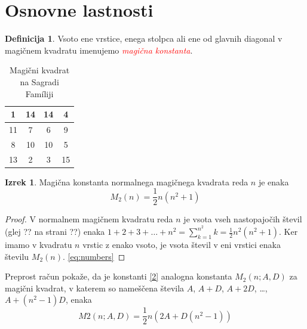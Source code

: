 \documentclass[a4paper,12pt]{article}
\theoremstyle{definition}
\newtheorem{theorem}{Izrek}
\newtheorem{definition}{Definicija}
\begin{document}

\section{Osnovne lastnosti}

  \begin{definition}
      Vsoto ene vrstice, enega stolpca ali ene od glavnih diagonal
      v magičnem kvadratu imenujemo \textcolor{red}{\emph{magična konstanta}}.
  \end{definition}

  \begin{table}[h!]
   \centering
   \caption{Magični kvadrat na Sagradi Famíliji}
   \label{sagrada}
   \begin{tabular}{|c|c|c|c|}
      \hline
      1 & 14 & 14 &  4 \\\hline
      11 &  7 &  6 &  9 \\\hline
       8 & 10 & 10 &  5 \\\hline
      13 &  2 &  3 & 15 \\\hline
   \end{tabular}
 \end{table}

  \begin{theorem}
    Magična konstanta normalnega magičnega kvadrata reda \( n \) je enaka
    \begin{equation}
       \label{eq:mc}
       M_2(n) = \frac{1}{2} n(n^2+1)
    \end{equation}
 \end{theorem}

\begin{proof}
   V normalnem magičnem kvadratu reda $n$ je vsota vseh nastopajočih
   števil (glej ?? na strani ??) enaka
   $1+2+3+\dots+n^2=\sum_{k=1}^{n^2}k=\frac{1}{2}n^2(n^2+1)$. Ker imamo
   v kvadratu $n$ vrstic z enako vsoto, je vsota števil v eni vrstici
   enaka številu $M_2(n)$. \ref{eq:numbers}
\end{proof}
   

Preprost račun pokaže, da je konstanti \ref{2} analogna konstanta
$M_2(n;A,D)$ za magični kvadrat, v katerem so nameščena števila
$A$, $A+D$, $A+2D$, \dots, $A+(n^2-1)D$, enaka
\begin{equation}
   \label{2}
   M2(n;A,D) = \frac{1}{2} n \left( 2A + D \left( n^2 - 1 \right) \right)
\end{equation}
\end{document}
